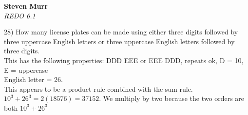 \documentclass{article}
\begin{document}
\setcounter{totalnumber}{5}
   \begin{flushright}
      \Large\textbf{Steven Murr}\\
      \large\textit{REDO 6.1} \\
   \end{flushright}
\begin{flushleft}
\makeatletter%
\setlength{\@fptop}{5pt}
\makeatother

\setlength\parindent{0pt}28) How many license plates can be made using either three digits followed by three uppercase English letters or three uppercase English letters followed by three digits.  \\
\setlength\parindent{24pt}This has the following properties: DDD EEE or EEE DDD, repeats ok, D = 10, E = uppercase \\English letter = 26. \\
\setlength\parindent{24pt}This appears to be a product rule combined with the sum rule.  $10^3 + 26^3 = 2(18576) = 37152$.  We multiply by two because the two orders are both $10^3 + 26^3$\\
~\\


\end{flushleft}
\end{document}
